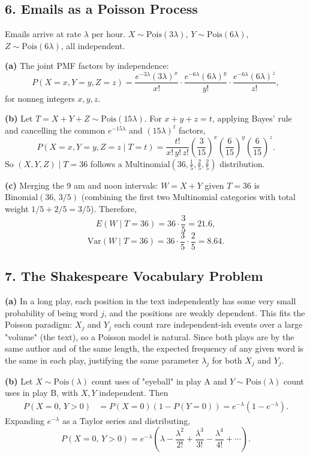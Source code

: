 \documentclass{article}
\begin{document}
\subsection*{6. Emails as a Poisson Process}

Emails arrive at rate $\lambda$ per hour. $X\sim\text{Pois}(3\lambda)$, $Y\sim\text{Pois}(6\lambda)$, $Z\sim\text{Pois}(6\lambda)$, all independent.

\textbf{(a)} The joint PMF factors by independence:
$$
P(X=x,Y=y,Z=z) = \frac{e^{-3\lambda}(3\lambda)^x}{x!}\cdot\frac{e^{-6\lambda}(6\lambda)^y}{y!}\cdot\frac{e^{-6\lambda}(6\lambda)^z}{z!},
$$
for nonneg integers $x,y,z$.

\textbf{(b)} Let $T=X+Y+Z\sim\text{Pois}(15\lambda)$. For $x+y+z=t$, applying Bayes' rule and cancelling the common $e^{-15\lambda}$ and $(15\lambda)^t$ factors,
$$
P(X=x,Y=y,Z=z\mid T=t) = \frac{t!}{x!\,y!\,z!}\left(\frac{3}{15}\right)^x\left(\frac{6}{15}\right)^y\left(\frac{6}{15}\right)^z.
$$
So $(X,Y,Z)\mid T=36$ follows a $\text{Multinomial}\!\left(36,\tfrac{1}{5},\tfrac{2}{5},\tfrac{2}{5}\right)$ distribution.

\textbf{(c)} Merging the 9 am and noon intervals: $W=X+Y$ given $T=36$ is $\text{Binomial}(36,\,3/5)$ (combining the first two Multinomial categories with total weight $1/5+2/5=3/5$). Therefore,
$$
E(W\mid T=36) = 36\cdot\frac{3}{5} = 21.6,
$$
$$
\text{Var}(W\mid T=36) = 36\cdot\frac{3}{5}\cdot\frac{2}{5} = 8.64.
$$

\subsection*{7. The Shakespeare Vocabulary Problem}

\textbf{(a)} In a long play, each position in the text independently has some very small probability of being word $j$, and the positions are weakly dependent. This fits the Poisson paradigm: $X_j$ and $Y_j$ each count rare independent-ish events over a large "volume" (the text), so a Poisson model is natural. Since both plays are by the same author and of the same length, the expected frequency of any given word is the same in each play, justifying the same parameter $\lambda_j$ for both $X_j$ and $Y_j$.

\textbf{(b)} Let $X\sim\text{Pois}(\lambda)$ count uses of "eyeball" in play A and $Y\sim\text{Pois}(\lambda)$ count uses in play B, with $X,Y$ independent. Then
\begin{align*}
P(X=0,\,Y>0) &= P(X=0)(1-P(Y=0)) = e^{-\lambda}(1-e^{-\lambda}).
\end{align*}
Expanding $e^{-\lambda}$ as a Taylor series and distributing,
$$
P(X=0,\,Y>0) = e^{-\lambda}\!\left(\lambda - \frac{\lambda^2}{2!} + \frac{\lambda^3}{3!} - \frac{\lambda^4}{4!}+\cdots\right).
$$
\end{document}
